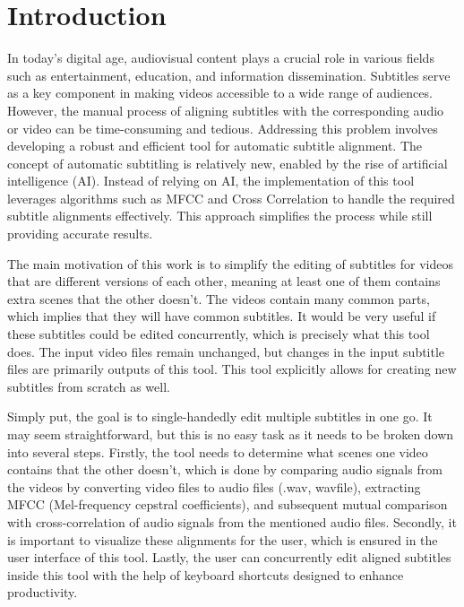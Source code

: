 
% 
\chapter{Introduction}

In today's digital age, audiovisual content plays a crucial role in various fields such as entertainment, education, and information dissemination. Subtitles serve as a key component in making videos accessible to a wide range of audiences. However, the manual process of aligning subtitles with the corresponding audio or video can be time-consuming and tedious. Addressing this problem involves developing a robust and efficient tool for automatic subtitle alignment. The concept of automatic subtitling is relatively new, enabled by the rise of artificial intelligence (AI). Instead of relying on AI, the implementation of this tool leverages algorithms such as MFCC and Cross Correlation to handle the required subtitle alignments effectively. This approach simplifies the process while still providing accurate results.

The main motivation of this work is to simplify the editing of subtitles for videos that are different versions of each other, meaning at least one of them contains extra scenes that the other doesn't. The videos contain many common parts, which implies that they will have common subtitles. It would be very useful if these subtitles could be edited concurrently, which is precisely what this tool does. The input video files remain unchanged, but changes in the input subtitle files are primarily outputs of this tool. This tool explicitly allows for creating new subtitles from scratch as well.

Simply put, the goal is to single-handedly edit multiple subtitles in one go. It may seem straightforward, but this is no easy task as it needs to be broken down into several steps. Firstly, the tool needs to determine what scenes one video contains that the other doesn't, which is done by comparing audio signals from the videos by converting video files to audio files (.wav, wavfile), extracting MFCC (Mel-frequency cepstral coefficients), and subsequent mutual comparison with cross-correlation of audio signals from the mentioned audio files. Secondly, it is important to visualize these alignments for the user, which is ensured in the user interface of this tool. Lastly, the user can concurrently edit aligned subtitles inside this tool with the help of keyboard shortcuts designed to enhance productivity.


